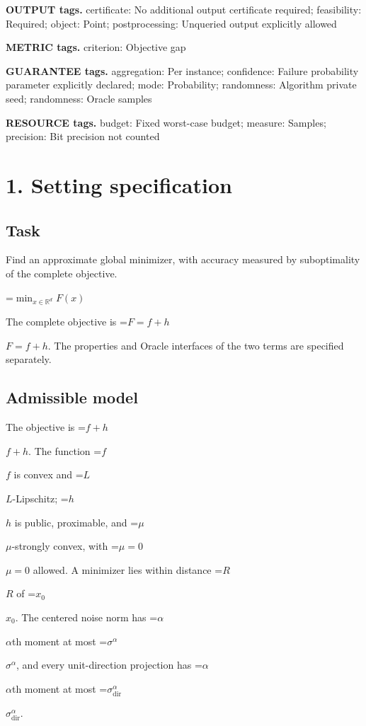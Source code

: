 \documentclass[10pt,a4paper]{article}
\newcommand{\AtlasMath}[1]{\par\begingroup\centering\setbox0=\hbox{$\displaystyle #1$}\ifdim\wd0>1.4\linewidth\typeout{ATLAS WIDE FORMULA: \the\wd0}\fi\ifdim\wd0>\linewidth\resizebox{\linewidth}{!}{\box0}\else\box0\fi\par\endgroup}
\newcommand{\AtlasInlineMath}[1]{\begingroup\setbox0=\hbox{$#1$}\ifdim\wd0>.4\linewidth\endgroup\AtlasMath{#1}\else\endgroup$#1$\fi}
\begin{document}
\textbf{OUTPUT tags.} certificate: No additional output certificate required; feasibility: Required; object: Point; postprocessing: Unqueried output explicitly allowed



\textbf{METRIC tags.} criterion: Objective gap



\textbf{GUARANTEE tags.} aggregation: Per instance; confidence: Failure probability parameter explicitly declared; mode: Probability; randomness: Algorithm private seed; randomness: Oracle samples



\textbf{RESOURCE tags.} budget: Fixed worst-case budget; measure: Samples; precision: Bit precision not counted



\section{1. Setting specification}


\subsection{Task}


Find an approximate global minimizer, with accuracy measured by suboptimality of the complete objective.




\AtlasMath{\min_{x\in \mathbb{R}^d}F(x)}




The complete objective is \AtlasInlineMath{F=f+h}. The properties and Oracle interfaces of the two terms are specified separately.



\subsection{Admissible model}


The objective is \AtlasInlineMath{f+h}. The function \AtlasInlineMath{f} is convex and \AtlasInlineMath{L}-Lipschitz; \AtlasInlineMath{h} is public, proximable, and \AtlasInlineMath{\mu}-strongly convex, with \AtlasInlineMath{\mu=0} allowed. A minimizer lies within distance \AtlasInlineMath{R} of \AtlasInlineMath{x_0}. The centered noise norm has \AtlasInlineMath{\alpha}th moment at most \AtlasInlineMath{\sigma^\alpha}, and every unit-direction projection has \AtlasInlineMath{\alpha}th moment at most \AtlasInlineMath{\sigma_{\mathrm{dir}}^\alpha}.
\end{document}
